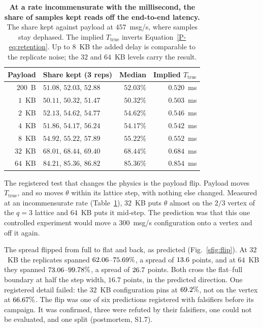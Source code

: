 \documentclass[10pt,journal,onecolumn]{IEEEtran}
\begin{document}
\begin{table}[tb]
\caption{\textbf{At a rate incommensurate with the millisecond, the share of samples kept reads off the end-to-end latency.} The share kept against payload at $457$~msg/s, where samples stay dephased. The implied
$T_{\mathrm{true}}$ inverts Equation~\ref{P-eq:retention}. Up to $8$~KB the added delay is
comparable to the replicate noise; the $32$ and $64$~KB levels carry the result.}
\label{stab:payloadret}
\small
\centering
\begin{tabular}{@{}rlrr@{}}
\toprule
Payload & Share kept (3 reps) & Median & Implied $T_{\mathrm{true}}$ \\
\midrule
$200$~B & $51.08$, $52.03$, $52.88$ & $52.03\%$ & $0.520$~ms \\
$1$~KB & $50.11$, $50.32$, $51.47$ & $50.32\%$ & $0.503$~ms \\
$2$~KB & $52.13$, $54.62$, $54.77$ & $54.62\%$ & $0.546$~ms \\
$4$~KB & $51.86$, $54.17$, $56.24$ & $54.17\%$ & $0.542$~ms \\
$8$~KB & $54.92$, $55.22$, $57.89$ & $55.22\%$ & $0.552$~ms \\
$32$~KB & $68.01$, $68.44$, $69.40$ & $68.44\%$ & $0.684$~ms \\
$64$~KB & $84.21$, $85.36$, $86.82$ & $85.36\%$ & $0.854$~ms \\
\bottomrule
\end{tabular}
\end{table}

The registered test that changes the physics is the payload flip. Payload moves
$T_{\mathrm{true}}$, and so moves $\theta$ within its lattice step, with nothing else changed.
Measured at an incommensurate rate (Table~\ref{stab:payloadret}), $32$~KB puts $\theta$ almost on
the $2/3$ vertex of the $q = 3$ lattice and $64$~KB puts it mid-step. The prediction was that this
one controlled experiment would move a $300$~msg/s configuration onto a vertex and off it again.

The spread flipped from full to flat and back, as predicted (Fig.~\ref{sfig:flip}). At $32$~KB the
\flipReplicatesThirtyTwoWord{} replicates spanned $62.06$--$75.69\%$, a
spread of $13.6$ points, and at $64$~KB they spanned
$73.06$--$99.78\%$, a spread of $26.7$ points. Both cross the
flat--full boundary at half the step width, $16.7$ points, in the predicted direction. One
registered detail failed: the $32$~KB configuration pins at $69.2\%$, not on the
vertex at $66.67\%$. The flip was one of six predictions registered with falsifiers
before its campaign. It was confirmed, three were refuted by their falsifiers, one could not be
evaluated, and one split (postmortem, S1.7).
\end{document}
